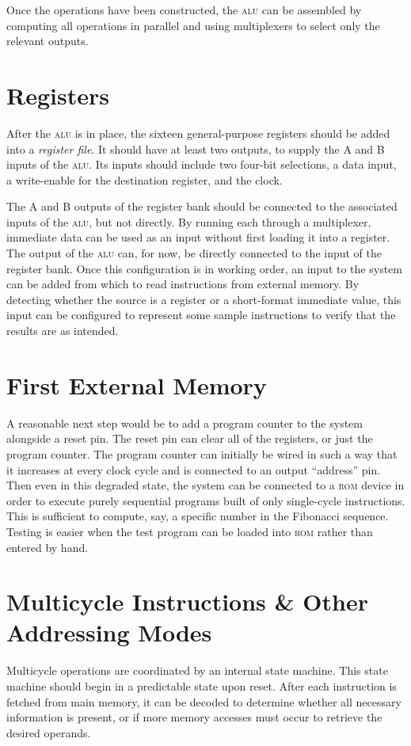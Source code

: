 \documentclass[12pt,english]{book}
\begin{document}
Once the operations have been constructed,
the \textsc{alu} can be assembled
by computing all operations in parallel
and using multiplexers to select only the relevant outputs.

\section{Registers}
After the \textsc{alu} is in place,
the sixteen general-purpose registers should be added
into a \emph{register file}.
It should have at least two outputs, to supply the A and B
inputs of the \textsc{alu}.
Its inputs should include
two four-bit selections,
a data input,
a write-enable for the destination register,
and the clock.

The A and B outputs of the register bank
should be connected to the associated inputs of the \textsc{alu},
but not directly.
By running each through a multiplexer,
immediate data can be used as an input
without first loading it into a register.
The output of the \textsc{alu} can, for now, be directly connected
to the input of the register bank.
Once this configuration is in working order,
an input to the system can be added
from which to read instructions from external memory.
By detecting whether the source is a register
or a short-format immediate value,
this input can be configured to represent some sample instructions
to verify that the results are as intended.

\section{First External Memory}
A reasonable next step would be to add a program counter
to the system alongside a reset pin.
The reset pin can clear all of the registers,
or just the program counter.
The program counter can initially be wired in such a way
that it increases at every clock cycle
and is connected to an output ``address'' pin.
Then even in this degraded state,
the system can be connected to a \textsc{rom} device
in order to execute purely sequential programs
built of only single-cycle instructions.
This is sufficient to compute, say,
a specific number in the Fibonacci sequence.
Testing is easier when the test program
can be loaded into \textsc{rom}
rather than entered by hand.

\section{Multicycle Instructions \& Other Addressing Modes}
Multicycle operations are coordinated by an internal state machine.
This state machine should begin in a predictable state upon reset.
After each instruction is fetched from main memory,
it can be decoded to determine
whether all necessary information is present,
or if more memory accesses must occur to retrieve
the desired operands.
\end{document}
